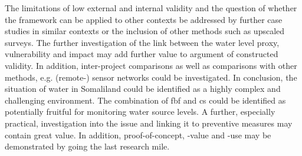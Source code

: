 The limitations of low external and internal validity and the question of whether the framework can be applied to other contexts be addressed by further case studies in similar contexts or the inclusion of other methods such as upscaled surveys. The further investigation of the link between the water level proxy, vulnerability and impact may add further value to argument of constructed validity. In addition, inter-project comparisons as well as comparisons with other methods, e.g. (remote-) sensor networks could be investigated.\newline
In conclusion, the situation of water in Somaliland could be identified as a highly complex and challenging environment. The combination of \acrlong{fbf} and \acrlong{cs} could be identified as potentially fruitful for monitoring water source levels. A further, especially practical, investigation into the issue and linking it to preventive measures may contain great value. In addition, proof-of-concept, -value and -use may be demonstrated by going the last research mile. 



